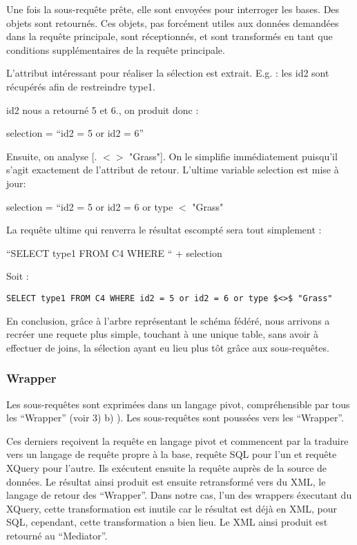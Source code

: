 Une fois la sous-requête prête, elle sont envoyées pour interroger les bases. Des objets sont retournés. Ces objets, pas forcément utiles aux données demandées dans la requête principale, sont réceptionnés, et sont transformés en tant que conditions supplémentaires de la requête principale.

L’attribut intéressant pour réaliser la sélection est extrait. E.g. : les id2 sont récupérés afin de restreindre type1.

id2 nous a retourné 5 et 6., on produit donc :

selection = “id2 = 5 or id2 = 6”

Ensuite, on analyse [. $<>$ "Grass"]. On le simplifie immédiatement puisqu’il s’agit exactement de l’attribut de retour. L’ultime variable selection est mise à jour:

selection = “id2 = 5 or id2 = 6 or type $<$ "Grass"

La requête ultime qui renverra le résultat escompté sera tout simplement :

“SELECT type1 FROM C4 WHERE “ + selection

Soit :

\lstset{language=SQL}
\begin{lstlisting}
SELECT type1 FROM C4 WHERE id2 = 5 or id2 = 6 or type $<>$ "Grass"
\end{lstlisting}

En conclusion, grâce à l’arbre représentant le schéma fédéré, nous arrivons a recréer une requete plus simple, touchant à une unique table,  sans avoir à effectuer de joins, la sélection ayant eu lieu plus tôt grâce aux sous-requêtes.

\subsubsection{Wrapper}

Les sous-requêtes sont exprimées dans un langage pivot, compréhensible par tous les “Wrapper” (voir 3) b) ). Les sous-requêtes sont poussées vers les “Wrapper”.

Ces derniers reçoivent la requête en langage pivot et commencent par la traduire vers un langage de requête propre à la base, requête SQL pour l’un et requête XQuery pour l’autre. Ils exécutent ensuite la requête auprès de la source de données. Le résultat ainsi produit est ensuite retransformé vers du XML, le langage de retour des “Wrapper”. Dans notre cas, l’un des wrappers éxecutant du XQuery, cette transformation est inutile car le résultat est déjà en XML, pour SQL, cependant, cette transformation a bien lieu. Le XML ainsi produit est retourné au “Mediator”.

